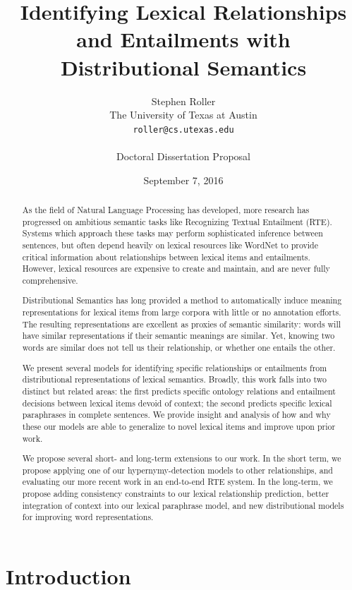 \documentclass[12pt]{article}
\title{Identifying Lexical Relationships and Entailments with Distributional Semantics}
\author{Stephen Roller\\
The University of Texas at Austin\\
{\tt roller@cs.utexas.edu}\\
\\
Doctoral Dissertation Proposal}
\date{September 7, 2016}
\begin{document}
\maketitle

\begin{abstract}
  As the field of Natural Language Processing has developed, more research has
  progressed on ambitious semantic tasks like Recognizing Textual Entailment
  (RTE). Systems which approach these tasks may perform sophisticated
  inference between sentences, but often depend heavily on lexical resources
  like WordNet to provide critical information about relationships between
  lexical items and entailments. However, lexical resources are expensive to
  create and maintain, and are never fully comprehensive.

  Distributional Semantics has long provided a method to automatically induce
  meaning representations for lexical items from large corpora with little or
  no annotation efforts. The resulting representations are excellent
  as proxies of semantic similarity: words will have similar representations if
  their semantic meanings are similar. Yet, knowing two words are similar does
  not tell us their relationship, or whether one entails the other.

  We present several models for identifying specific relationships or
  entailments from distributional representations of lexical semantics.
  Broadly, this work falls into two distinct but related areas: the first
  predicts specific ontology relations and entailment decisions between
  lexical items devoid of context; the second predicts specific lexical
  paraphrases in complete sentences. We provide insight and analysis of how and
  why these our models are able to generalize to novel lexical items and
  improve upon prior work.

  We propose several short- and long-term extensions to our work. In the
  short term, we propose applying one of our hypernymy-detection models to
  other relationships, and evaluating our more recent work in an end-to-end
  RTE system. In the long-term, we propose adding consistency constraints to
  our lexical relationship prediction, better integration of context into
  our lexical paraphrase model, and new distributional models for improving
  word representations.
\end{abstract}

\pagebreak
\tableofcontents
\pagebreak

\section{Introduction}
\label{sec:intro}
\end{document}
